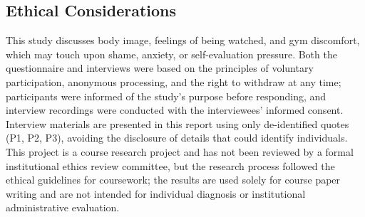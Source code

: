 \subsection{Ethical Considerations}

This study discusses body image, feelings of being watched, and gym discomfort, which may touch upon shame, anxiety, or self-evaluation pressure.
Both the questionnaire and interviews were based on the principles of voluntary participation, anonymous processing, and the right to withdraw at any time; participants were informed of the study's purpose before responding, and interview recordings were conducted with the interviewees' informed consent.
Interview materials are presented in this report using only de-identified quotes (P1, P2, P3), avoiding the disclosure of details that could identify individuals.
This project is a course research project and has not been reviewed by a formal institutional ethics review committee, but the research process followed the ethical guidelines for coursework; the results are used solely for course paper writing and are not intended for individual diagnosis or institutional administrative evaluation.
